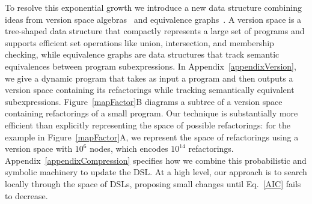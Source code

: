 \documentclass{article}
\newcommand{\code}[1]{{\footnotesize\texttt{#1}}}
\begin{document}
To resolve this exponential growth we introduce a new data structure
combining ideas from version space
algebras~\cite{lau2001programming,mitchell1977version,polozov2015flashmeta}
and equivalence graphs~\cite{tate2009equality}. A version space is a
tree-shaped data structure that compactly represents a large set of
programs and supports efficient set operations like union,
intersection, and membership checking, while equivalence graphs are
data structures that track semantic equivalences between program
subexpressions.  In Appendix~\ref{appendixVersion}, we give a dynamic
program that takes as input a program and then outputs a version space
containing its refactorings while tracking semantically equivalent
subexpressions. Figure~\ref{mapFactor}B diagrams a subtree of a
version space containing refactorings of a small program. Our
technique is substantially more efficient than explicitly representing
the space of possible refactorings: for the example in
Figure~\ref{mapFactor}A, we represent the space of refactorings using
a version space with $10^6$ nodes, which encodes $10^{14}$
refactorings. Appendix~\ref{appendixCompression} specifies how we
combine this probabilistic and symbolic machinery to update the DSL.
At a high level, our approach is to search locally through the space
of DSLs, proposing small changes until Eq.~\ref{AIC} fails to
decrease.




\end{document}
